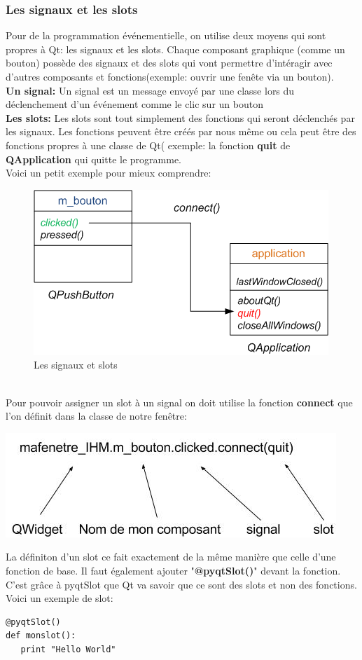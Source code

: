 \documentclass[a4paper,11pt]{article}
\begin{document}
\subsubsection{Les signaux et les slots}
Pour de la programmation événementielle, on utilise deux moyens qui sont propres à Qt: les signaux et les slots. Chaque composant graphique (comme un bouton) possède des signaux et des slots qui vont permettre d'intéragir avec d'autres composants et fonctions(exemple: ouvrir une fenête via un bouton).\\
\linebreak
\textbf{Un signal:} Un signal est un message envoyé par une classe lors du déclenchement d'un événement comme le clic sur un bouton\\
\textbf{Les slots:} Les slots sont tout simplement des fonctions qui seront déclenchés par les signaux. Les fonctions peuvent être créés par nous même ou cela peut être des fonctions propres à une classe de Qt( exemple: la fonction \textbf{quit} de \textbf{QApplication} qui quitte le programme.\\
Voici un petit exemple pour mieux comprendre:\\
\begin{figure}[hbtp]
\centering
\includegraphics[scale=0.5]{exemple_signal_slot.png}
\caption{Les signaux et slots}
\end{figure}\\
Pour pouvoir assigner un slot à un signal on doit utilise la fonction \textbf{connect} que l'on définit dans la classe de notre fenêtre:
\begin{center}
\includegraphics[scale=0.4]{signal_slot.jpg} 
\end{center}
La définiton d'un slot ce fait exactement de la même manière que celle d'une fonction de base. Il faut également ajouter "\textbf{@pyqtSlot()}" devant la fonction. C'est grâce à pyqtSlot que Qt va savoir que ce sont des slots et non des fonctions.\\
Voici un exemple de slot:
\begin{lstlisting}
@pyqtSlot()
def monslot():
   print "Hello World"
\end{lstlisting}
\end{document}
